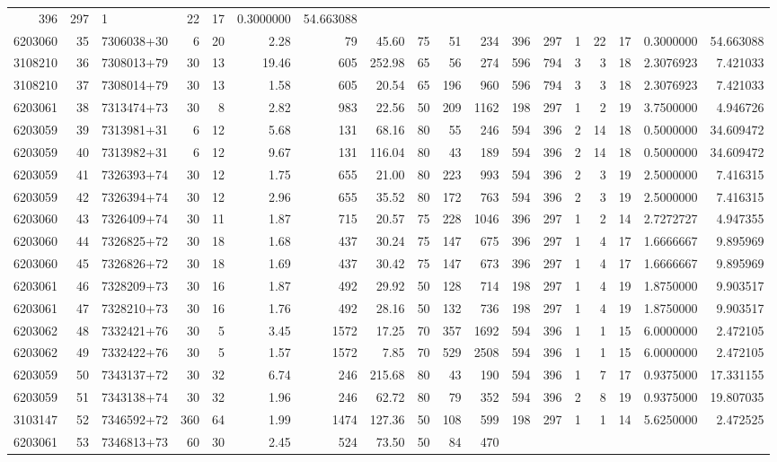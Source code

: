\documentclass[
]{article}
\begin{document}
\begin{longtable}[]{@{}rrlrrrrrrrrrrrrrrr@{}}
396 & 297 & 1 & 22 & 17 & 0.3000000 & 54.663088\tabularnewline
6203060 & 35 & 7306038+30 & 6 & 20 & 2.28 & 79 & 45.60 & 75 & 51 & 234 &
396 & 297 & 1 & 22 & 17 & 0.3000000 & 54.663088\tabularnewline
3108210 & 36 & 7308013+79 & 30 & 13 & 19.46 & 605 & 252.98 & 65 & 56 &
274 & 596 & 794 & 3 & 3 & 18 & 2.3076923 & 7.421033\tabularnewline
3108210 & 37 & 7308014+79 & 30 & 13 & 1.58 & 605 & 20.54 & 65 & 196 &
960 & 596 & 794 & 3 & 3 & 18 & 2.3076923 & 7.421033\tabularnewline
6203061 & 38 & 7313474+73 & 30 & 8 & 2.82 & 983 & 22.56 & 50 & 209 &
1162 & 198 & 297 & 1 & 2 & 19 & 3.7500000 & 4.946726\tabularnewline
6203059 & 39 & 7313981+31 & 6 & 12 & 5.68 & 131 & 68.16 & 80 & 55 & 246
& 594 & 396 & 2 & 14 & 18 & 0.5000000 & 34.609472\tabularnewline
6203059 & 40 & 7313982+31 & 6 & 12 & 9.67 & 131 & 116.04 & 80 & 43 & 189
& 594 & 396 & 2 & 14 & 18 & 0.5000000 & 34.609472\tabularnewline
6203059 & 41 & 7326393+74 & 30 & 12 & 1.75 & 655 & 21.00 & 80 & 223 &
993 & 594 & 396 & 2 & 3 & 19 & 2.5000000 & 7.416315\tabularnewline
6203059 & 42 & 7326394+74 & 30 & 12 & 2.96 & 655 & 35.52 & 80 & 172 &
763 & 594 & 396 & 2 & 3 & 19 & 2.5000000 & 7.416315\tabularnewline
6203060 & 43 & 7326409+74 & 30 & 11 & 1.87 & 715 & 20.57 & 75 & 228 &
1046 & 396 & 297 & 1 & 2 & 14 & 2.7272727 & 4.947355\tabularnewline
6203060 & 44 & 7326825+72 & 30 & 18 & 1.68 & 437 & 30.24 & 75 & 147 &
675 & 396 & 297 & 1 & 4 & 17 & 1.6666667 & 9.895969\tabularnewline
6203060 & 45 & 7326826+72 & 30 & 18 & 1.69 & 437 & 30.42 & 75 & 147 &
673 & 396 & 297 & 1 & 4 & 17 & 1.6666667 & 9.895969\tabularnewline
6203061 & 46 & 7328209+73 & 30 & 16 & 1.87 & 492 & 29.92 & 50 & 128 &
714 & 198 & 297 & 1 & 4 & 19 & 1.8750000 & 9.903517\tabularnewline
6203061 & 47 & 7328210+73 & 30 & 16 & 1.76 & 492 & 28.16 & 50 & 132 &
736 & 198 & 297 & 1 & 4 & 19 & 1.8750000 & 9.903517\tabularnewline
6203062 & 48 & 7332421+76 & 30 & 5 & 3.45 & 1572 & 17.25 & 70 & 357 &
1692 & 594 & 396 & 1 & 1 & 15 & 6.0000000 & 2.472105\tabularnewline
6203062 & 49 & 7332422+76 & 30 & 5 & 1.57 & 1572 & 7.85 & 70 & 529 &
2508 & 594 & 396 & 1 & 1 & 15 & 6.0000000 & 2.472105\tabularnewline
6203059 & 50 & 7343137+72 & 30 & 32 & 6.74 & 246 & 215.68 & 80 & 43 &
190 & 594 & 396 & 1 & 7 & 17 & 0.9375000 & 17.331155\tabularnewline
6203059 & 51 & 7343138+74 & 30 & 32 & 1.96 & 246 & 62.72 & 80 & 79 & 352
& 594 & 396 & 2 & 8 & 19 & 0.9375000 & 19.807035\tabularnewline
3103147 & 52 & 7346592+72 & 360 & 64 & 1.99 & 1474 & 127.36 & 50 & 108 &
599 & 198 & 297 & 1 & 1 & 14 & 5.6250000 & 2.472525\tabularnewline
6203061 & 53 & 7346813+73 & 60 & 30 & 2.45 & 524 & 73.50 & 50 & 84 & 470

\end{longtable}
\end{document}
